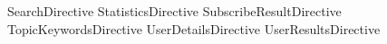 SearchDirective
StatisticsDirective
SubscribeResultDirective
TopicKeywordsDirective
UserDetailsDirective
UserResultsDirective